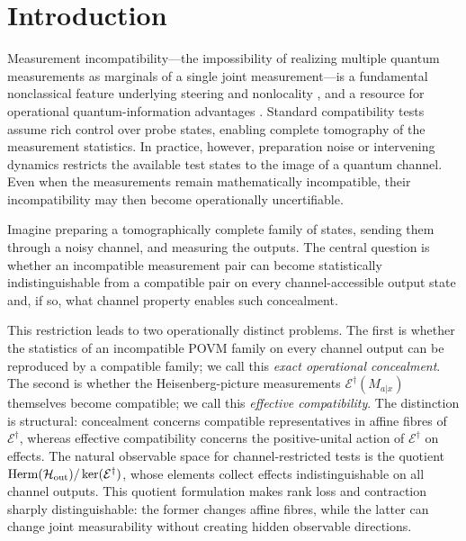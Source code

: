 \documentclass[
aps,pra,twocolumn,10pt,
superscriptaddress,longbibliography,floatfix
]{revtex4-2}
\DeclareMathOperator{\Herm}{Herm}
\begin{document}
\maketitle

\section{Introduction}
\label{sec:intro}

Measurement incompatibility---the impossibility of realizing multiple quantum measurements as marginals of a single joint measurement---is a fundamental nonclassical feature underlying steering and nonlocality \cite{Wolf2009,Heinosaari2016,Guhne2023}, and a resource for operational quantum-information advantages \cite{Uola2019,Buscemi2020}. Standard compatibility tests assume rich control over probe states, enabling complete tomography of the measurement statistics. In practice, however, preparation noise or intervening dynamics restricts the available test states to the image of a quantum channel. Even when the measurements remain mathematically incompatible, their incompatibility may then become operationally uncertifiable.

Imagine preparing a tomographically complete family of states, sending them through a noisy channel, and measuring the outputs. The central question is whether an incompatible measurement pair can become statistically indistinguishable from a compatible pair on every channel-accessible output state and, if so, what channel property enables such concealment.

This restriction leads to two operationally distinct problems. The first is whether the statistics of an incompatible POVM family on every channel output can be reproduced by a compatible family; we call this \emph{exact operational concealment}. The second is whether the Heisenberg-picture measurements $\mathcal E^\dagger(M_{a|x})$ themselves become compatible; we call this \emph{effective compatibility}. The distinction is structural: concealment concerns compatible representatives in affine fibres of $\mathcal E^\dagger$, whereas effective compatibility concerns the positive-unital action of $\mathcal E^\dagger$ on effects. The natural observable space for channel-restricted tests is the quotient $\Herm(\mathcal H_{\rm out})/\ker(\mathcal E^\dagger)$, whose elements collect effects indistinguishable on all channel outputs. This quotient formulation makes rank loss and contraction sharply distinguishable: the former changes affine fibres, while the latter can change joint measurability without creating hidden observable directions.
\end{document}
